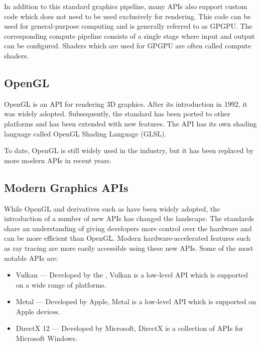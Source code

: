 In addition to this standard graphics pipeline, many \glspl{API} also support custom code which does not need to be used exclusively for rendering. This code can be used for general-purpose computing and is generally referred to as \gls{GPGPU}. The corresponding compute pipeline consists of a single stage where input and output can be configured. Shaders which are used for \gls{GPGPU} are often called compute shaders.

\subsection*{OpenGL}

\gls{OpenGL} is an \gls{API} for rendering 3D graphics. After its introduction in 1992, it was widely adopted. Subsequently, the standard has been ported to other platforms and has been extended with new features. The \gls{API} has its own shading language called OpenGL Shading Language (\gls{GLSL}).

To date, \gls{OpenGL} is still widely used in the industry, but it has been replaced by more modern \glspl{API} in recent years.

\subsection*{Modern Graphics APIs}

While \gls{OpenGL} and derivatives such as  have been widely adopted, the introduction of a number of new \glspl{API} has changed the landscape. The standards share an understanding of giving developers more control over the hardware and can be more efficient than \gls{OpenGL}. Modern hardware-accelerated features such as ray tracing are more easily accessible using these new \glspl{API}. Some of the most notable \glspl{API} are:

\begin{itemize}
    \item{\gls{Vulkan}} — Developed by the , Vulkan is a low-level \gls{API} which is supported on a wide range of platforms.
    \item{\gls{Metal}} — Developed by Apple, Metal is a low-level \gls{API} which is supported on Apple devices.
    \item{\gls{DirectX 12}} — Developed by Microsoft, DirectX is a collection of \glspl{API} for Microsoft Windows.
\end{itemize}

